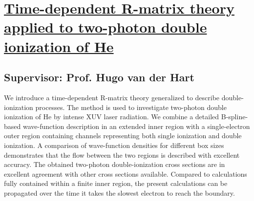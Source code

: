 \section{\href{https://doi.org/10.1103/PhysRevA.89.053407}{Time-dependent R-matrix theory applied to two-photon double ionization of He}}

\subsection*{Supervisor: Prof. Hugo van der Hart}


We introduce a time-dependent R-matrix theory generalized to describe double-ionization processes. The method is used to investigate two-photon double ionization of He by intense XUV laser radiation. We combine a detailed B-spline-based wave-function description in an extended inner region with a single-electron outer region containing channels representing both single ionization and double ionization. A comparison of wave-function densities for different box sizes demonstrates that the flow between the two regions is described with excellent accuracy. The obtained two-photon double-ionization cross sections are in excellent agreement with other cross sections available. Compared to calculations fully contained within a finite inner region, the present calculations can be propagated over the time it takes the slowest electron to reach the boundary.
